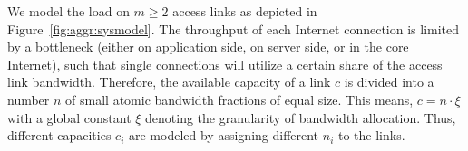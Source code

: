 





%

We model the load on $m\geq 2$ access links as depicted in Figure~\ref{fig:aggr:sysmodel}. The throughput of each Internet connection is limited by a bottleneck (either on application side, on server side, or in the core Internet), such that single connections will utilize a certain share of the access link bandwidth. Therefore, the available capacity of a link $c$ is divided into a number $n$ of small atomic bandwidth fractions of equal size. This means, $c = n\cdot \xi$ with a global constant $\xi$ denoting the granularity of bandwidth allocation. Thus, different capacities $c_i$ are modeled by assigning different $n_i$ to the links.

